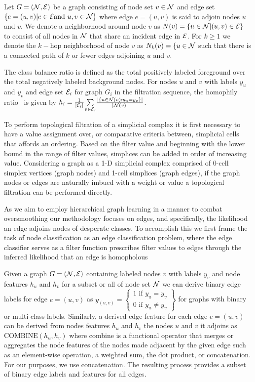 Let $G=(\mathcal{N}, \mathcal{E})$ be a graph consisting of node set $v\in \mathcal{N}$ and edge set $\{e=(u,v) | e \in \mathcal{E} \text{and } u,v\in \mathcal{N}\}$ where edge $e=(u,v)$ is said to adjoin nodes $u$ and $v$. We denote a neighborhood around node $v$ as $N(v)=\{ u\in\mathcal{N} | (u,v)\in \mathcal{E}\}$ to consist of all nodes in $\mathcal{N}$ that share an incident edge in $\mathcal{E}$. For $k\geq1$ we denote the $k-$hop neighborhood of node $v$ as $N_k(v) =\{u\in \mathcal{N}$ such that there is a connected path of $k$ or fewer edges adjoining $u$ and $v$.

 The class balance ratio is defined as the total positively labeled foreground over the total negatively labeled background nodes. For nodes $u$ and $v$ with labels $y_u$ and $y_v$ and edge set $\mathcal{E}_i$ for graph $G_i$ in the filtration sequence, the homophily ratio~\cite{zhu2020beyond} is given by 
$
h_i = \frac{1}{|\mathcal{E}_i |} \underset{v\in \mathcal{E}_i }{\sum} \frac{ | \{u \in \mathcal{N}(v) : y_u = y_v \} | }{|\mathcal{N}(v)|}
$.

To perform topological filtration of a simplicial complex it is first necessary to have a value assignment over, or comparative criteria between, simplicial cells that affords an ordering. Based on the filter value and beginning with the lower bound in the range of filter values, simplices can be added in order of increasing value. Considering a graph as a 1-D simplicial complex comprised of 0-cell simplex vertices (graph nodes) and 1-cell simplices (graph edges), if the graph nodes or edges are naturally imbued with a weight or value a topological filtration can be performed directly. 

As we aim to employ hierarchical graph learning in a manner to combat oversmoothing our methodology focuses on edges, and specifically, the likelihood an edge adjoins nodes of desperate classes. To accomplish this we first frame the task of node classification as an edge classification problem, where the edge classifier serves as a filter function prescribes filter values to edges through the inferred likelihood that an edge is homopholous

Given a graph $G=(\mathcal{N}, \mathcal{E})$ containing labeled nodes $v$ with labels $y_v$ and node features $h_u$ and $h_v$ for a subset or all of node set $\mathcal{N}$ we can derive binary edge labels for edge $e=(u,v)$ as $y_{(u,v)} = \left\{ \begin{array}{c} 1 \text{ if }y_u = y_v \\ 0 \text{ if } y_u \neq y_v \end{array}\right\}$ for graphs with binary or multi-class labels. Similarly, a derived edge feature for each edge $e=(u,v)$ can be derived from nodes features $h_u$ and $h_v$ the nodes $u$ and $v$ it adjoins as $\text{COMBINE}(h_u,h_v)$ where combine is a functional operator that merges or aggregates the node features of the nodes made adjacent by the given edge such as an element-wise operation, a weighted sum, the dot product, or concatenation. For our purposes, we use concatenation. The resulting process provides a subset of binary edge labels and features for all edges.


